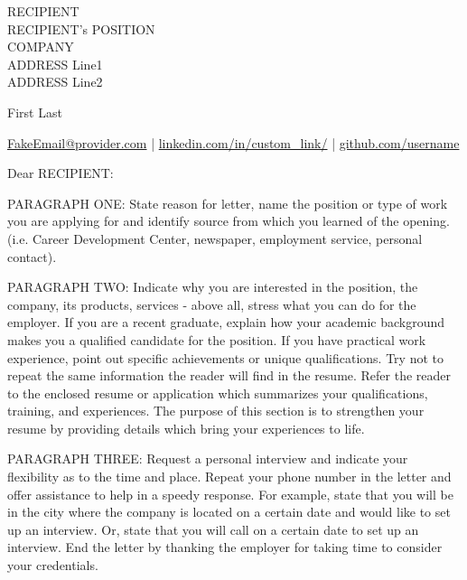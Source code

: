 \documentclass[11pt]{letter}
\newcommand{\emaillink}[1]{\href{mailto:#1}{#1}}
\newcommand{\genericlink}[1]{\href{https://www.#1}{#1}}
\begin{document}
\begin{letter}{RECIPIENT \\
    RECIPIENT's POSITION \\
        COMPANY \\
        ADDRESS Line1 \\
        ADDRESS Line2}
    \centerline{\Huge First Last}
\centerline{ \emaillink{FakeEmail@provider.com} | \genericlink{linkedin.com/in/custom\_link/} | \genericlink{github.com/username}}

    \noindent\hrulefill

    \opening{Dear RECIPIENT:}

    \noindent PARAGRAPH ONE: State reason for letter, name the position or type of
    work you are applying for and identify source from  which  you
    learned   of   the  opening.  (i.e.  Career  Development  Center,
    newspaper, employment service, personal contact).



    \noindent PARAGRAPH  TWO:  Indicate why you are interested in the position,
    the company, its products, services - above all, stress what you
    can  do  for  the employer. If you are a recent graduate, explain  how
    your academic background makes you a qualified candidate for the
    position. If  you have practical work experience, point out
    specific achievements or unique qualifications. Try not to repeat
    the  same  information  the reader will find in the resume. Refer
    the reader to the enclosed resume or application which summarizes
    your  qualifications,  training,  and experiences. The purpose of
    this section is to strengthen your resume  by  providing  details
    which bring your experiences to life.


    \noindent PARAGRAPH THREE: Request a personal interview and  indicate  your
    flexibility as to the time and place. Repeat your phone number in
    the letter and offer assistance to help in a speedy response. For
    example,  state that you will be in the city where the company is
    located on a certain date and would like to set up an  interview.
    Or,  state  that  you  will  call  on a certain date to set up an
    interview. End the letter by thanking  the  employer  for  taking
    time to consider your credentials.
    

\end{letter}
\end{document}
